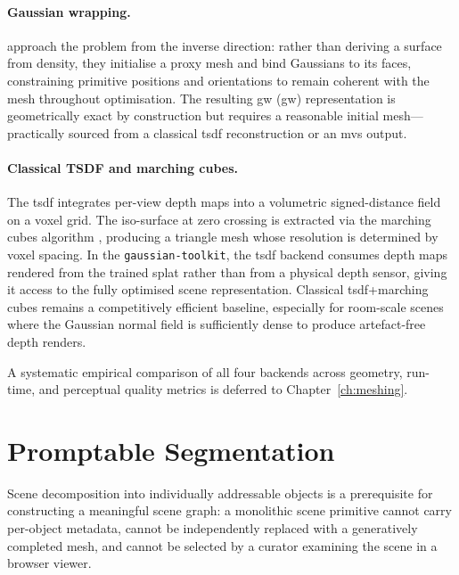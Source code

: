 \paragraph{Gaussian wrapping.}
\textcite{Waczynska2024GaussianWrapping} approach the problem from the inverse
direction: rather than deriving a surface from density, they initialise a proxy
mesh and bind Gaussians to its faces, constraining primitive positions and
orientations to remain coherent with the mesh throughout optimisation. The
resulting \acrlong{gw} (\acrshort{gw}) representation is geometrically exact by
construction but requires a reasonable initial mesh---practically sourced from a
classical \acrshort{tsdf} reconstruction or an \acrshort{mvs} output.

\paragraph{Classical TSDF and marching cubes.}
The \acrlong{tsdf} \parencite{Curless1996} integrates per-view depth maps into a
volumetric signed-distance field on a voxel grid. The iso-surface at zero crossing
is extracted via the marching cubes algorithm \parencite{Lorensen1987}, producing
a triangle mesh whose resolution is determined by voxel spacing. In the
\texttt{gaussian-toolkit}, the \acrshort{tsdf} backend consumes depth maps rendered
from the trained splat rather than from a physical depth sensor, giving it access
to the fully optimised scene representation. Classical \acrshort{tsdf}+marching
cubes remains a competitively efficient baseline, especially for room-scale scenes
where the Gaussian normal field is sufficiently dense to produce artefact-free
depth renders.

A systematic empirical comparison of all four backends across geometry, run-time,
and perceptual quality metrics is deferred to Chapter~\ref{ch:meshing}.

\section{Promptable Segmentation}\label{sec:sam}

Scene decomposition into individually addressable objects is a prerequisite for
constructing a meaningful scene graph: a monolithic scene primitive cannot carry
per-object metadata, cannot be independently replaced with a generatively completed
mesh, and cannot be selected by a curator examining the scene in a browser viewer.


